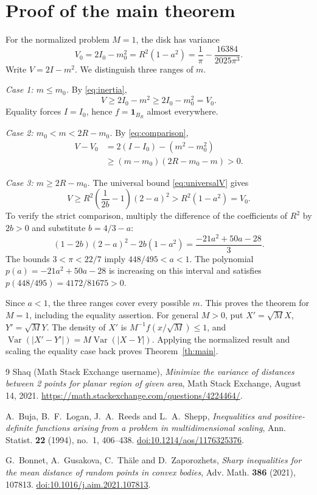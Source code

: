 \documentclass[11pt,a4paper]{amsart}
\theoremstyle{remark}
\newcommand{\Var}{\operatorname{Var}}
\newcommand{\ind}{\mathbf{1}}
\begin{document}
\section{Proof of the main theorem}
For the normalized problem $M=1$, the disk has variance
\begin{equation}\label{eq:V0}
 V_0=2I_0-m_0^2=R^2(1-a^2)
 =\frac1\pi-\frac{16384}{2025\pi^3}.
\end{equation}
Write $V=2I-m^2$. We distinguish three ranges of $m$.

\smallskip\noindent
\emph{Case 1: $m\le m_0$.}
By \eqref{eq:inertia},
\[
 V\ge 2I_0-m^2\ge 2I_0-m_0^2=V_0.
\]
Equality forces $I=I_0$, hence $f=\ind_{B_R}$ almost everywhere.

\smallskip\noindent
\emph{Case 2: $m_0<m<2R-m_0$.}
By \eqref{eq:comparison},
\begin{align*}
 V-V_0&=2(I-I_0)-(m^2-m_0^2)\\
 &\ge (m-m_0)(2R-m_0-m)>0.
\end{align*}

\smallskip\noindent
\emph{Case 3: $m\ge 2R-m_0$.}
The universal bound \eqref{eq:universalV} gives
\[
 V\ge R^2\left(\frac1{2b}-1\right)(2-a)^2
 >R^2(1-a^2)=V_0.
\]
To verify the strict comparison, multiply the difference of the
coefficients of $R^2$ by $2b>0$ and substitute $b=4/3-a$:
\[
 (1-2b)(2-a)^2-2b(1-a^2)
 =\frac{-21a^2+50a-28}{3}.
\]
The bounds $3<\pi<22/7$ imply $448/495<a<1$. The polynomial
$p(a)=-21a^2+50a-28$ is increasing on this interval and satisfies
$p(448/495)=4172/81675>0$.

\smallskip
Since $a<1$, the three ranges cover every possible $m$. This proves
the theorem for $M=1$, including the equality assertion. For general
$M>0$, put $X'=\sqrt M X$, $Y'=\sqrt M Y$. The density of $X'$ is
$M^{-1}f(x/\sqrt M)\le1$, and
$\Var(|X'-Y'|)=M\Var(|X-Y|)$. Applying the normalized result and
scaling the equality case back proves Theorem~\ref{th:main}.

\begin{thebibliography}{9}
Shaq (Math Stack Exchange username),
\emph{Minimize the variance of distances between 2 points for planar
region of given area}, Math Stack Exchange, August 14, 2021.
\url{https://math.stackexchange.com/questions/4224464/}.

A.~Buja, B.~F.~Logan, J.~A.~Reeds and L.~A.~Shepp,
\emph{Inequalities and positive-definite functions arising from a
problem in multidimensional scaling},
Ann. Statist. \textbf{22} (1994), no.~1, 406--438.
\href{https://doi.org/10.1214/aos/1176325376}{doi:10.1214/aos/1176325376}.

G.~Bonnet, A.~Gusakova, C.~Th\"ale and D.~Zaporozhets,
\emph{Sharp inequalities for the mean distance of random points in
convex bodies}, Adv. Math. \textbf{386} (2021), 107813.
\href{https://doi.org/10.1016/j.aim.2021.107813}{doi:10.1016/j.aim.2021.107813}.
\end{thebibliography}
\end{document}
